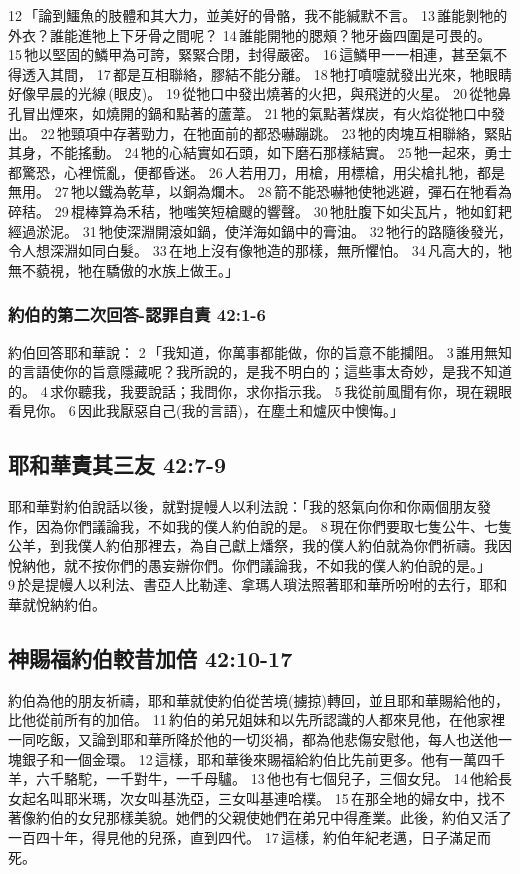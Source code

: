\begin{itemize}
12 「論到鱷魚的肢體和其大力，並美好的骨骼，我不能緘默不言。 13 誰能剝牠的外衣？誰能進牠上下牙骨之間呢？ 14 誰能開牠的腮頰？牠牙齒四圍是可畏的。 15 牠以堅固的鱗甲為可誇，緊緊合閉，封得嚴密。 16 這鱗甲一一相連，甚至氣不得透入其間， 17 都是互相聯絡，膠結不能分離。 18 牠打噴嚏就發出光來，牠眼睛好像早晨的光線 (眼皮)。 19 從牠口中發出燒著的火把，與飛迸的火星。 20 從牠鼻孔冒出煙來，如燒開的鍋和點著的蘆葦。 21 牠的氣點著煤炭，有火焰從牠口中發出。 22 牠頸項中存著勁力，在牠面前的都恐嚇蹦跳。 23 牠的肉塊互相聯絡，緊貼其身，不能搖動。 24 牠的心結實如石頭，如下磨石那樣結實。 25 牠一起來，勇士都驚恐，心裡慌亂，便都昏迷。 26 人若用刀，用槍，用標槍，用尖槍扎牠，都是無用。 27 牠以鐵為乾草，以銅為爛木。 28 箭不能恐嚇牠使牠逃避，彈石在牠看為碎秸。 29 棍棒算為禾秸，牠嗤笑短槍颼的響聲。 30 牠肚腹下如尖瓦片，牠如釘耙經過淤泥。 31 牠使深淵開滾如鍋，使洋海如鍋中的膏油。 32 牠行的路隨後發光，令人想深淵如同白髮。 33 在地上沒有像牠造的那樣，無所懼怕。 34 凡高大的，牠無不藐視，牠在驕傲的水族上做王。」
\end{itemize}

\subsubsection{約伯的第二次回答-認罪自責 42:1-6}
約伯回答耶和華說： 2 「我知道，你萬事都能做，你的旨意不能攔阻。 3 誰用無知的言語使你的旨意隱藏呢？我所說的，是我不明白的；這些事太奇妙，是我不知道的。 4 求你聽我，我要說話；我問你，求你指示我。 5 我從前風聞有你，現在親眼看見你。 6 因此我厭惡自己(我的言語)，在塵土和爐灰中懊悔。」

\subsection{耶和華責其三友 42:7-9}
耶和華對約伯說話以後，就對提幔人以利法說：「我的怒氣向你和你兩個朋友發作，因為你們議論我，不如我的僕人約伯說的是。 8 現在你們要取七隻公牛、七隻公羊，到我僕人約伯那裡去，為自己獻上燔祭，我的僕人約伯就為你們祈禱。我因悅納他，就不按你們的愚妄辦你們。你們議論我，不如我的僕人約伯說的是。」 9 於是提幔人以利法、書亞人比勒達、拿瑪人瑣法照著耶和華所吩咐的去行，耶和華就悅納約伯。


\subsection{神賜福約伯較昔加倍 42:10-17}
約伯為他的朋友祈禱，耶和華就使約伯從苦境(擄掠)轉回，並且耶和華賜給他的，比他從前所有的加倍。 11 約伯的弟兄姐妹和以先所認識的人都來見他，在他家裡一同吃飯，又論到耶和華所降於他的一切災禍，都為他悲傷安慰他，每人也送他一塊銀子和一個金環。 12 這樣，耶和華後來賜福給約伯比先前更多。他有一萬四千羊，六千駱駝，一千對牛，一千母驢。 13 他也有七個兒子，三個女兒。 14 他給長女起名叫耶米瑪，次女叫基洗亞，三女叫基連哈樸。 15 在那全地的婦女中，找不著像約伯的女兒那樣美貌。她們的父親使她們在弟兄中得產業。此後，約伯又活了一百四十年，得見他的兒孫，直到四代。 17 這樣，約伯年紀老邁，日子滿足而死。







